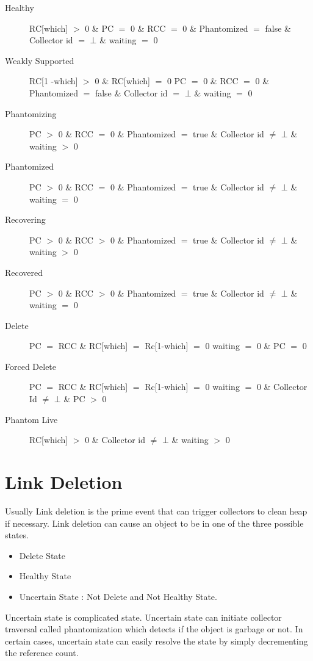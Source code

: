 \documentclass{article}
\begin{document}
\begin{description}
  \item[Healthy] RC[which] $>$ 0 \& PC $=$ 0 \& RCC $=$ 0 \& Phantomized $=$ false \& Collector id $=$ $\bot$ \& waiting $=$ 0
  \item[Weakly Supported] RC[1 -which] $>$ 0 \& RC[which] $=$ 0 PC $=$ 0 \& RCC $=$ 0 \& Phantomized $=$ false \& Collector id $=$ $\bot$ \& waiting $=$ 0
  \item[Phantomizing] PC $>$ 0 \& RCC $=$ 0 \& Phantomized $=$ true \& Collector id $\neq$ $\bot$ \& waiting $>$ 0
  \item[Phantomized] PC $>$ 0 \& RCC $=$ 0 \& Phantomized $=$ true \& Collector id $\neq$ $\bot$ \& waiting $=$ 0
   \item[Recovering] PC $>$ 0 \& RCC $>$ 0 \& Phantomized $=$ true \& Collector id $\neq$ $\bot$ \& waiting $>$ 0
   \item[Recovered] PC $>$ 0 \& RCC $>$ 0 \& Phantomized $=$ true \& Collector id $\neq$ $\bot$ \& waiting $=$ 0
  \item[Delete] PC $=$ RCC \& RC[which] $=$ Rc[1-which] $=$ 0 waiting $=$ 0 \& PC $=$ 0
  \item[Forced Delete] PC $=$ RCC \& RC[which] $=$ Rc[1-which] $=$ 0 waiting $=$ 0 \& Collector Id $\neq$ $\bot$ \& PC $>$ 0
  \item[Phantom Live] RC[which] $>$ 0 \& Collector id $\neq$ $\bot$ \& waiting $>$ 0
\end{description}
\section{Link Deletion}
	Usually Link deletion is the prime event that can trigger collectors to clean heap if necessary. Link deletion can cause an object to be in one of the three possible states. 
\begin{itemize}
  \item Delete State
  \item Healthy State
  \item Uncertain State : Not Delete and Not Healthy State.
\end{itemize}
	Uncertain state is complicated state. Uncertain state can initiate collector traversal called phantomization which detects if the object is garbage or not. In certain cases, uncertain state can easily resolve the state by simply decrementing the reference count. 
\end{document}
